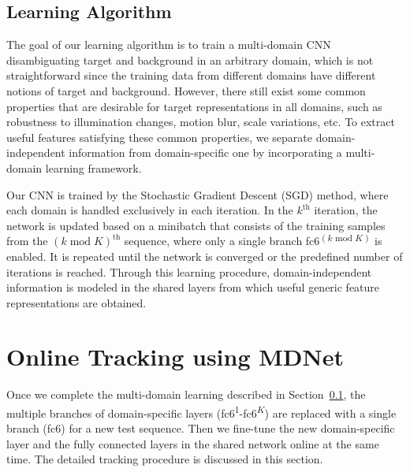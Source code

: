 \documentclass[10pt,twocolumn,letterpaper]{article}
\begin{document}
\subsection{Learning Algorithm}
\label{sec:mdl}
The goal of our learning algorithm is to train a multi-domain CNN disambiguating target and background in an arbitrary domain, which is not straightforward since the training data from different domains have different notions of target and background.
However, there still exist some common properties that are desirable for target representations in all domains, such as robustness to illumination changes, motion blur, scale variations, etc.
To extract useful features satisfying these common properties, we separate domain-independent  information from domain-specific one by incorporating a multi-domain learning framework.

Our CNN is trained by the Stochastic Gradient Descent (SGD) method, where each domain is handled exclusively in each iteration. 
In the $k^{\text{th}}$ iteration, the network is updated based on a minibatch that consists of the training samples from the $(k \operatorname{mod} K)^{\text{th}}$ sequence, where only a single branch fc6\textsuperscript{$(k \operatorname{mod} K)$} is enabled. 
It is repeated until the network is converged or the predefined number of iterations is reached.
Through this learning procedure, domain-independent information is modeled in the shared layers from which useful generic feature representations are obtained.


\section{Online Tracking using MDNet}
\label{sec:online}
Once we complete the multi-domain learning described in Section~\ref{sec:mdl}, the multiple branches of domain-specific layers (fc6\textsuperscript{1}-fc6\textsuperscript{$K$}) are replaced with a single branch (fc6) for a new test sequence. 
Then we fine-tune the new domain-specific layer and the fully connected layers in the shared network online at the same time.
The detailed tracking procedure is discussed in this section.
\end{document}
